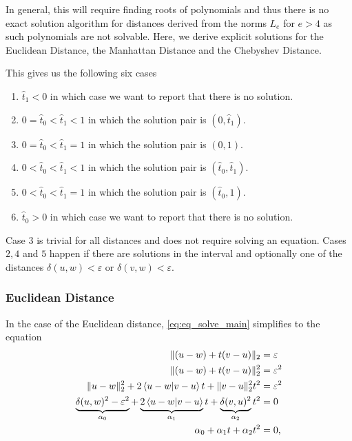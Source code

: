 In general, this will require finding roots of polynomials and thus there is no exact solution algorithm for distances derived from the norms \(L_e\) for \(e > 4\) as such polynomials are not solvable. Here, we derive explicit solutions for the Euclidean Distance, the Manhattan Distance and the Chebyshev Distance. 


This gives us the following six cases 
\begin{enumerate}
  \item \(\hat t_1 < 0\) in which case we want to report that there is no solution.
  \item \(0 = \hat t_0 < \hat t_1 < 1\) in which the solution pair is \((0, \hat t_1)\).
  \item \(0 = \hat t_0 < \hat t_1 = 1\) in which the solution pair is \((0, 1)\).
  \item \(0 < \hat t_0 < \hat t_1 < 1\) in which the solution pair is \((\hat t_0, \hat t_1)\).
  \item \(0 < \hat t_0 < \hat t_1 = 1\) in which the solution pair is \((\hat t_0, 1)\).
  \item \(\hat t_0 > 0\) in which case we want to report that there is no solution.
\end{enumerate}

Case \(3\) is trivial for all distances and does not require solving an equation. Cases \(2, 4\) and \(5\) happen if there are solutions in the interval and optionally one of the distances \(\delta(u,w) < \varepsilon\) or \(\delta(v,w) < \varepsilon\).


\subsubsection{Euclidean Distance}
\label{subsubsec:eq_euclidean_distance}
In the case of the Euclidean distance, \cref{eq:eq_solve_main} simplifies to the equation 
\begin{align*}
  \| (u - w) + t(v - u) \|_2 &= \varepsilon \\
  \| (u - w) + t(v - u) \|_2^2 &= \varepsilon^2 \\
  \| u - w \|_2^2 + 2\braket{u - w | v - u} t  +  \| v - u \|_2^2 t^2 &= \varepsilon^2 \\
  \underbrace{\delta(u,w)^2 - \varepsilon^2}_{\alpha_0} + \underbrace{2\braket{u - w | v - u} }_{\alpha_1}t  +  \underbrace{\delta(v, u)^2}_{\alpha_2} t^2 &= 0 \\
  \alpha_0 + \alpha_1 t  + \alpha_2 t^2 &= 0,
\end{align*}

